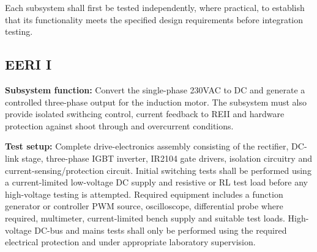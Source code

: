 Each subsystem shall first be tested independently, where
practical, to establish that its functionality meets the
specified design requirements before integration testing.


\subsection{EERI I}
\label{subsec:eeri-i-tests}

\textbf{Subsystem function:} Convert the single-phase 230VAC to DC and generate a controlled three-phase output for the
induction motor. The subsystem must also provide isolated swithcing control, current feedback to REII and hardware
protection against shoot through and overcurrent conditions.

\textbf{Test setup:} Complete drive-electronics assembly consisting of the rectifier, DC-link stage, three-phase IGBT 
inverter, IR2104 gate drivers, isolation circuitry and current-sensing/protection circuit. Initial switching tests shall
be performed using a current-limited low-voltage DC supply and resistive or RL test load before any high-voltage 
testing is attempted. Required equipment includes a function generator or controller PWM source, oscilloscope, 
differential probe where required, multimeter, current-limited bench supply and suitable test loads. High-voltage 
DC-bus and mains tests shall only be performed using the required electrical protection and under appropriate 
laboratory supervision.

